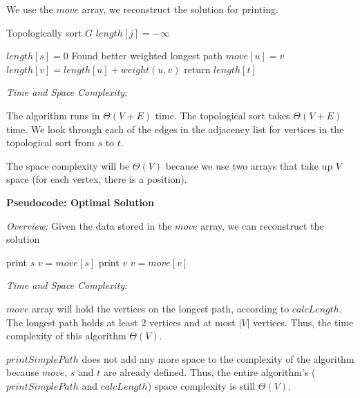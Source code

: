 \documentclass[a4paper]{report}
\begin{document}
\begin{enumerate}
      We use the $move$ array, we reconstruct the solution for printing.

      \begin{algorithmic}[1]
          \State Topologically sort $G$
            \State $length[j] = -\infty$
          \EndFor

          \State $length[s] = 0$
                \Comment Found better weighted longest path
                \State $move[u] = v$
                \State $length[v] = length[u] + weight(u,v)$
              \EndIf
            \EndFor
          \EndFor
          \State return $length[t]$
        \EndFunction
      \end{algorithmic}

      {\it Time and Space Complexity:}

      The algorithm runs in $\Theta(V+E)$ time. The topological sort takes $\Theta(V+E)$ time. We look through each of the
      edges in the adjacency list for vertices in the topological sort from $s$ to $t$. 

      The space complexity will be $\Theta(V)$ because we use two arrays that take up $V$ space (for each vertex, there is
      a position). 

      {\bf Pseudocode: Optimal Solution}

      {\it Overview:}
      Given the data stored in the $move$ array, we can reconstruct the solution

      \begin{algorithmic}[1]
          \State print $s$
          \State $v = move[s]$
            \State print $v$
            \State $v = move[v]$
          \EndWhile
        \EndFunction
      \end{algorithmic}

      {\it Time and Space Complexity:}

      $move$ array will hold the vertices on the longest path, according to $calcLength$. 
      The longest path holds at least 2 vertices and at most $|V|$ vertices. Thus, the time complexity of this algorithm $\Theta(V)$.

      $printSimplePath$ does not add any more space to the complexity of the algorithm because $move$, $s$ and $t$ are already
      defined. Thus, the entire algorithm's ($printSimplePath$ and $calcLength$) space complexity is still $\Theta(V)$.


\end{enumerate}
\end{document}
